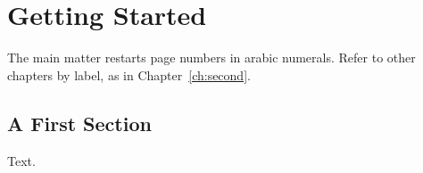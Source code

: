 \chapter{Getting Started}
\label{ch:first}
The main matter restarts page numbers in arabic numerals. Refer to other
chapters by label, as in Chapter~\ref{ch:second}.

\section{A First Section}
Text.
